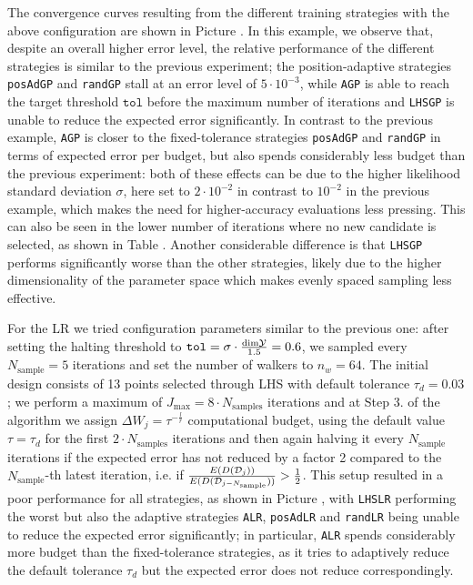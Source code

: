 The convergence curves resulting from the different training strategies with the above configuration are shown in Picture .
In this example, we observe that, despite an overall higher error level, the relative performance of the different strategies is similar to the previous experiment; the position-adaptive strategies \texttt{posAdGP} and \texttt{randGP} stall at an error level of $5\cdot 10^{-3}$, while \texttt{AGP} is able to reach the target threshold $\texttt{tol}$ before the maximum number of iterations and \texttt{LHSGP} is unable to reduce the expected error significantly.
In contrast to the previous example, \texttt{AGP} is closer to the fixed-tolerance strategies \texttt{posAdGP} and \texttt{randGP} in terms of expected error per budget, but also spends considerably less budget than the previous experiment: both of these effects can be due to the higher likelihood standard deviation $\sigma$, here set to $2\cdot 10^{-2}$ in contrast to $10^{-2}$ in the previous example, which makes the need for higher-accuracy evaluations less pressing.
This can also be seen in the lower number of iterations where no new candidate is selected, as shown in Table .
Another considerable difference is that \texttt{LHSGP} performs significantly worse than the other strategies, likely due to the higher dimensionality of the parameter space which makes evenly spaced sampling less effective.

For the LR we tried configuration parameters similar to the previous one: after setting the halting threshold to $\texttt{tol} = \sigma \cdot \frac{\text{dim} \mathcal Y }{1.5} = 0.6$, we sampled every $N_{\text{sample}} = 5 $ iterations and set the number of walkers to $n_w = 64$.
The initial design consists of 13 points selected through LHS with default tolerance $\tau_d = 0.03$; we perform a maximum of $J_{\max} = 8 \cdot N_{\text{samples}}$ iterations and at Step 3. of the algorithm we assign $\Delta W_j = \tau ^{-\frac{l}{r}}$ computational budget, using the default value $\tau= \tau_d$ for the first $2\cdot N_{\text{samples}}$ iterations and then again halving it every $N_{\text{sample}}$ iterations if the expected error has not reduced by a factor 2 compared to the $N_{\text{sample}}$-th latest iteration, i.e. if $\frac{E(D(\mathcal D_j))}{E(D(\mathcal D_{j-N_{\text{sample}}}))} > \frac{1}{2}$.
This setup resulted in a poor performance for all strategies, as shown in Picture , with \texttt{LHSLR} performing the worst but also the adaptive strategies \texttt{ALR}, \texttt{posAdLR} and \texttt{randLR} being unable to reduce the expected error significantly; in particular, \texttt{ALR} spends considerably more budget than the fixed-tolerance strategies, as it tries to adaptively reduce the default tolerance $\tau_d$ but the expected error does not reduce correspondingly.

